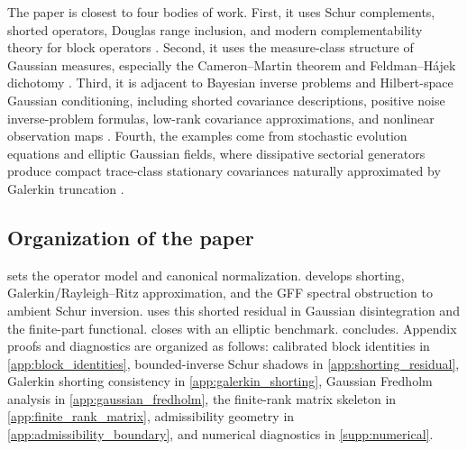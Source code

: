 \documentclass[preprint,12pt]{elsarticle}
\theoremstyle{plain}
\theoremstyle{definition}
\theoremstyle{remark}
\begin{document}
    The paper is closest to four bodies of work.  First, it uses Schur
    complements, shorted operators, Douglas range inclusion, and modern
    complementability theory for block operators
    \cite{krein1947selfadjoint,anderson1975shorted,douglas1966majorization,tretter2008spectral,contino2018schur,friedrich2017generalized,contino2021matrix,naikjohnson2024complementable}.
    Second, it uses the measure-class structure of Gaussian measures,
    especially the Ca\-me\-ron--Mar\-tin theorem and Feld\-man--H\'{a}\-jek dichotomy
    \cite{feldman1958equivalence,hajek1958property,bogachev1998gaussian}.
    Third, it is adjacent to Bayesian inverse problems and Hilbert-space
    Gaussian conditioning, including shorted covariance descriptions, positive
    noise inverse-problem formulas, low-rank covariance approximations, and nonlinear
    observation maps
    \cite{owhadi2015conditioning,stuart2010inverse,steinwart2024conditioning,chen2024gaussian,carerelie2024covariance,carerelie2025mean,quang2022kl}.
    Fourth, the examples come from stochastic evolution equations and elliptic
    Gaussian fields, where dissipative sectorial generators produce compact
    trace-class stationary covariances naturally approximated by Galerkin
    truncation \cite{daprato2014stochastic,lord2014introduction,simon2005trace,henderson2022sobolev,jorgensentian2024hilbert}.

    \subsection{Organization of the paper}
    \label{sec:organization}

     sets the operator model and canonical normalization.
     develops shorting, Galerkin/Rayleigh--Ritz approximation,
    and the GFF spectral obstruction to ambient Schur inversion.
     uses this shorted residual in Gaussian
    disintegration and the finite-part functional.  closes with an
    elliptic benchmark.  concludes.    Appendix proofs and diagnostics are organized as follows:
    calibrated block identities in \ref{app:block_identities},
    bounded-inverse Schur shadows in \ref{app:shorting_residual},
    Galerkin shorting consistency in \ref{app:galerkin_shorting},
    Gaussian Fredholm analysis in \ref{app:gaussian_fredholm},
    the finite-rank matrix skeleton in \ref{app:finite_rank_matrix},
    admissibility geometry in \ref{app:admissibility_boundary},
    and numerical diagnostics in \ref{supp:numerical}.
\end{document}
